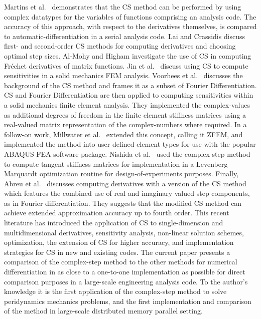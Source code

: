\documentclass[preprint,12pt]{elsarticle}
\begin{document}
Martins et al.\ \cite{martins2003complex} demonstrates that the CS method can be performed by using complex datatypes for the variables of functions comprising an analysis code. The accuracy of this approach, with respect to the derivatives themselves, is compared to automatic-differentiation in a serial analysis code. Lai and Crassidis \cite{lai2008extensions} discuss first- and second-order CS methods for computing derivatives and choosing optimal step sizes.  Al-Mohy and Higham \cite{al2010complex} investigate the use of CS in computing Fr\'{e}chet derivatives of matrix functions. Jin et al.\ \cite{jin2010improved} discuss using CS to compute sensitivities in a solid mechanics FEM analysis.  Voorhees et al.\ \cite{voorhees2011complex} discusses the background of the CS method and frames it as a subset of Fourier Differentiation. CS and Fourier Differentiation are then applied to computing sensitivities within a solid mechanics finite element analysis. They implemented the complex-values as additional degrees of freedom in the finite element stiffness matrices using a real-valued matrix representation of the complex-numbers where required. In a follow-on work,  Millwater et al.\  \cite{millwater2013application} extended this concept, calling it ZFEM, and implemented the method into user defined element types for use with the popular ABAQUS \cite{systemes2012abaqus} FEA software package.  Nishida et al.\ \cite{nishida2013} used the complex-step method to compute tangent-stiffness matrices for implementation in a Levenberg-Marquardt optimization routine for design-of-experiments purposes.  Finally, Abreu et al.\ \cite{abreu2013generalization} discusses computing derivatives with a version of the CS method which features the combined use of real and imaginary valued step components, as in Fourier differentiation.  They suggests that the modified CS method can achieve extended approximation accuracy up to fourth order.  This recent literature has introduced the application of CS to single-dimension and multidimensional derivatives, sensitivity analysis, non-linear solution schemes, optimization, the extension of CS for higher accuracy, and implementation strategies for CS in new and existing codes.  The current paper presents a comparison of the complex-step method to the other methods for numerical differentiation in as close to a one-to-one implementation as possible for direct comparison purposes in a large-scale engineering analysis code. To the author's knowledge it is the first application of the complex-step method to solve peridynamics mechanics problems, and the first implementation and comparison of the method in large-scale distributed memory parallel setting. 
\end{document}
